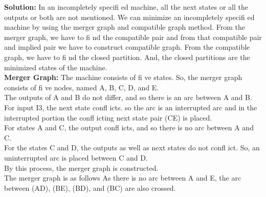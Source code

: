 \documentclass[12pt,a4paper]{book}
\begin{document}
\textbf{Solution:}  In an incompletely specifi ed machine, all the next states or all the outputs or both are not
mentioned. We can minimize an incompletely specifi ed machine by using the merger graph and
compatible graph method. From the merger graph, we have to fi nd the compatible pair and from that
compatible pair and implied pair we have to construct compatible graph. From the compatible graph,
we have to fi nd the closed partition. And, the closed partitions are the minimized states of the machine.\\
\textbf{Merger Graph:}  The machine consists of fi ve states. So, the merger graph consists of fi ve nodes,
named A, B, C, D, and E.\\ The outputs of A and B do not differ, and so there is an arc between A and
B. For input I3, the next state confl icts. so the arc
is an interrupted arc and in the interrupted portion
the confl icting next state pair (CE) is placed.\\
For states A and C, the output confl icts, and so
there is no arc between A and C.\\
For the states C and D, the outputs as well as
next states do not confl ict. So, an uninterrupted
arc is placed between C and D.\\
By this process, the merger graph is constructed.\\
The merger graph is as follows
As there is no arc between A and E, the
arc between (AD), (BE), (BD), and (BC) are
also crossed.
\begin{center}
\end{center}
\end{document}
